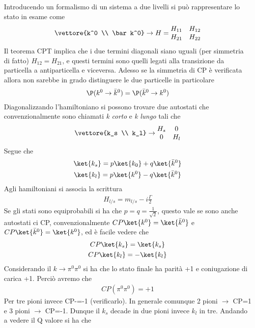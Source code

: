 \documentclass[12pt]{book}
\begin{document}
Introducendo un formalismo di un sistema a due livelli si può rappresentare lo stato in esame come
\begin{gather}
	\vettore{k^0 \\ \bar k^0} \rightarrow H = \begin{matrix}
		H_{11} & H_{12} \\ H_{21} & H_{22}
	\end{matrix}
\end{gather}
Il teorema CPT implica che i due termini diagonali siano uguali (per simmetria di fatto) $H_{12}=H_{21}$, e questi termini sono quelli legati alla transizione da particella a antiparticella e viceversa. Adesso se la simmetria di CP è verificata allora non sarebbe in grado distinguere le due particelle in particolare
\begin{gather}
	\P (k^0 \rightarrow \bar k^0) = \P ( \bar k^0 \rightarrow k^0)
\end{gather}
Diagonalizzando l'hamiltoniano si possono trovare due autostati che convenzionalmente sono chiamati \textit{k corto} e \textit{k lungo} tali che 
\begin{gather}
	\vettore{k_s \\ k_l} \rightarrow \begin{matrix}
		H_s & 0 \\ 0 & H_l
	\end{matrix}
\end{gather}
Segue che 
\begin{gather}
	\ket{k_s} = p \ket{k_0} + q \ket{\bar k^0}\\
	\ket{k_l} = p \ket{k^0} - q \ket{\bar k^0}
\end{gather}
Agli hamiltoniani si associa la scrittura
\begin{gather}
	H_{l/s} =  m_{l/s} - i \frac{\Gamma}{2}
\end{gather}
Se gli stati sono equiprobabili si ha che $p=q= \frac{1}{\sqrt{2}}$, questo vale se sono anche autostati ci CP, convenzionalmente $CP \ket{k^0} =  \ket{\bar k^0}$ e $CP \ket{ \bar k^0} = \ket{k^0}$, ed è facile vedere che
\begin{gather}
	CP \ket{k_s} = \ket{k_s}\\
	CP \ket{k_l} = - \ket{k_l}
\end{gather}
Considerando il $k \rightarrow \pi^0 \pi^0$ si ha che lo stato finale ha parità +1 e coniugazione di carica +1. Perciò avremo che 
\begin{gather}
	CP ( \pi^0 \pi^0) = +1
\end{gather}
Per tre pioni invece CP-=-1 (verificarlo). In generale comunque 2 pioni $\rightarrow$ CP=1 e 3 pioni $\rightarrow$ CP=-1. Dunque il $k_s$ decade in due pioni invece $k_l$ in tre. Andando a vedere il Q valore si ha che 
\end{document}
